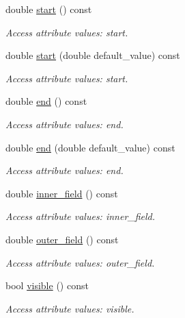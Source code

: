 \begin{DoxyCompactItemize}
double \hyperlink{struct_d_d4hep_1_1_x_m_l_1_1_dimension_a41440e4961276f75dff4c836baaf65af}{start} () const
\begin{DoxyCompactList}\small\item\em Access attribute values\+: start. \end{DoxyCompactList}\item 
double \hyperlink{struct_d_d4hep_1_1_x_m_l_1_1_dimension_a8d84727b50bdd1f1341681d4b310b176}{start} (double default\+\_\+value) const
\begin{DoxyCompactList}\small\item\em Access attribute values\+: start. \end{DoxyCompactList}\item 
double \hyperlink{struct_d_d4hep_1_1_x_m_l_1_1_dimension_a9e47548fd8406192455f22c25073987d}{end} () const
\begin{DoxyCompactList}\small\item\em Access attribute values\+: end. \end{DoxyCompactList}\item 
double \hyperlink{struct_d_d4hep_1_1_x_m_l_1_1_dimension_aa649c0c505f10cbf51e2b0d7c24fe9fe}{end} (double default\+\_\+value) const
\begin{DoxyCompactList}\small\item\em Access attribute values\+: end. \end{DoxyCompactList}\item 
double \hyperlink{struct_d_d4hep_1_1_x_m_l_1_1_dimension_afbdb9d66db8ae29aa56ed2493fe51332}{inner\+\_\+field} () const
\begin{DoxyCompactList}\small\item\em Access attribute values\+: inner\+\_\+field. \end{DoxyCompactList}\item 
double \hyperlink{struct_d_d4hep_1_1_x_m_l_1_1_dimension_a40907564ab825308af9dd03ec1f7647f}{outer\+\_\+field} () const
\begin{DoxyCompactList}\small\item\em Access attribute values\+: outer\+\_\+field. \end{DoxyCompactList}\item 
bool \hyperlink{struct_d_d4hep_1_1_x_m_l_1_1_dimension_ab62917a655c72e27cae07984025203c3}{visible} () const
\begin{DoxyCompactList}\small\item\em Access attribute values\+: visible. \end{DoxyCompactList}\item 

\end{DoxyCompactItemize}
